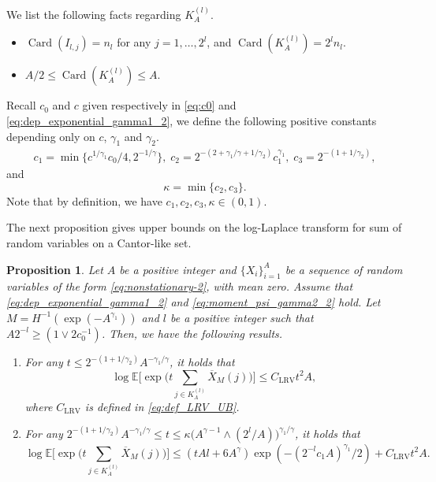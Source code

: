 \documentclass[11pt]{article}
\DeclareMathOperator*{\card}{Card}
\theoremstyle{plain}
\newtheorem{proposition}[theorem]{Proposition}
\theoremstyle{definition}
\begin{document}
We list the following facts regarding $K_A^{(l)}$.
\begin{itemize}
    \item $\card(I_{l,j}) = n_l$ for any $j = 1, \dots, 2^l$, and $\card(K_A^{(l)}) = 2^ln_l$.
    \item $A/2 \leq \card(K_A^{(l)}) \leq A$.
\end{itemize}



Recall $c_0$ and $c$ given respectively in \eqref{eq:c0} and \eqref{eq:dep_exponential_gamma1_2}, we define the following positive constants depending only on $c$, $\gamma_1$ and $\gamma_2$.
\begin{equation}\label{eq:c1c2c3}
\begin{aligned}
    c_1 = \min\{c^{1/\gamma_1}c_0/4, 2^{-1/\gamma}\},\; c_2 = 2^{-(2+\gamma_1/\gamma+1/\gamma_2)}c_1^{\gamma_1},\; c_3 = 2^{-(1+1/\gamma_2)},
\end{aligned}
\end{equation}
and
\begin{equation}\label{eq:kappa}
    \kappa = \min\{c_2, c_3\}.
\end{equation}
Note that by definition, we have $c_1, c_2, c_3, \kappa \in (0,1)$.

The next proposition gives upper bounds on the log-Laplace transform for sum of random variables on a Cantor-like set.
\begin{proposition}\label{prop:bernstein_bound_cantor}
    Let $A$ be a positive integer and $\{X_i\}_{i = 1}^A$ be a sequence of random variables of the form \eqref{eq:nonstationary-2}, with mean zero. Assume that \eqref{eq:dep_exponential_gamma1_2} and \eqref{eq:moment_psi_gamma2_2} hold.
    Let $M = H^{-1}(\exp(-A^{\gamma_1}))$ and $l$ be a positive integer such that $A2^{-l} \geq (1 \vee 2c_0^{-1})$. Then, we have the following results.
    \begin{enumerate}
        \item[(i)] For any $t \leq 2^{-(1+1/\gamma_2)}A^{-\gamma_1/\gamma}$, it holds that
        \begin{equation*}
            \log\mathbb{E}\Big[\exp\Big(t\sum_{j \in K_{A}^{(l)}}\overline{X}_{M}(j)\Big)\Big] \leq C_{\mathrm{LRV}}t^2A,
        \end{equation*}
        where $C_{\mathrm{LRV}}$ is defined in \eqref{eq:def_LRV_UB}.
        \item[(ii)] For any $2^{-(1+1/\gamma_2)}A^{-\gamma_1/\gamma} \leq t \leq \kappa\big(A^{\gamma-1} \wedge (2^l/A)\big)^{\gamma_1/\gamma}$, it holds that
        \begin{equation*}
        \log\mathbb{E}\Big[\exp\Big(t\sum_{j \in K_{A}^{(l)}}\overline{X}_{M}(j)\Big)\Big] \leq (tAl + 6A^{\gamma})\exp(-(2^{-l}c_1A)^{\gamma_1}/2) + C_{\mathrm{LRV}}t^2A.
    \end{equation*}
    \end{enumerate}
\end{proposition}
\end{document}
